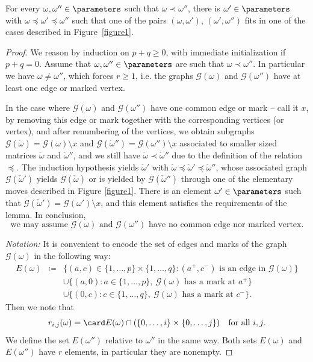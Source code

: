 \begin{lemma}
\label{L3.6}
For every $\omega,\omega''\in\parameters$ such that $\omega\prec\omega''$, there is $\omega'\in\parameters$ with $\omega\preceq\omega'\preceq\omega''$ such that one of the pairs $(\omega,\omega')$, $(\omega',\omega'')$ fits in one of the cases described in Figure~\ref{figure1}.
\end{lemma}

\begin{proof}
We reason by induction on $p+q\geq 0$, with immediate initialization if $p+q=0$.
Assume that $\omega,\omega''\in\parameters$ are such that $\omega\prec\omega''$. In particular we have $\omega\not=\omega''$,
which forces $r\geq 1$,
i.e.  the graphs $\mathcal{G}(\omega)$ and $\mathcal{G}(\omega'')$ have at least one edge or marked vertex.

In the case where $\mathcal{G}(\omega)$ and $\mathcal{G}(\omega'')$ have
one common edge or mark -- call it $x$,
by removing this edge or mark together with the corresponding vertices (or vertex), and after renumbering of the vertices, we obtain subgraphs $\mathcal{G}(\check\omega)=\mathcal{G}(\omega)\setminus x$ and $\mathcal{G}(\check\omega'')=\mathcal{G}(\omega'')\setminus x$ associated to smaller sized matrices $\check\omega$ and $\check\omega''$, and we still have $\check\omega\prec\check\omega''$ due to the definition of the relation $\preceq$. The induction hypothesis yields $\check\omega'$ with $\check\omega\preceq\check\omega'\preceq\check\omega''$, whose associated graph $\mathcal{G}(\check\omega')$ yields $\mathcal{G}(\check\omega)$ or is yielded by $\mathcal{G}(\check\omega'')$ through one of the elementary moves described in Figure \ref{figure1}. There is an element $\omega'\in\parameters$ such that $\mathcal{G}(\check\omega')=\mathcal{G}(\omega')\setminus x$, and this element satisfies the requirements of the lemma. In conclusion,
\begin{equation}
\label{no-common-edge}
\mbox{we may assume $\mathcal{G}(\omega)$ and $\mathcal{G}(\omega'')$ have no common edge nor marked vertex.}
\end{equation}

\noindent
{\it Notation:}
It is convenient to encode the set of edges and marks of the graph $\mathcal{G}(\omega)$ in the following way:
\begin{eqnarray*}
E(\omega) & \coloneqq  & \{(a,c)\in\{1,\ldots,p\}\times\{1,\ldots,q\}:\mbox{$(a^+,c^-)$ is an edge in $\mathcal{G}(\omega)$}\}\\
 & & \cup\{(a,0):a\in\{1,\ldots,p\},\ \mbox{$\mathcal{G}(\omega)$ has a mark at $a^+$}\}\\
 & & \cup\{(0,c):c\in\{1,\ldots,q\},\ \mbox{$\mathcal{G}(\omega)$ has a mark at $c^-$}\}.
\end{eqnarray*}
Then we note that
\begin{equation}
\label{E-and-rij}
r_{i,j}(\omega)=\card E(\omega)\cap(\{0,\ldots,i\}\times\{0,\ldots,j\})\quad\mbox{for all $i,j$}.
\end{equation}
We define the set $E(\omega'')$ relative to $\omega''$ in the same way.
Both sets $E(\omega)$ and $E(\omega'')$ have $r$ elements, in particular they are nonempty.



\end{proof}

